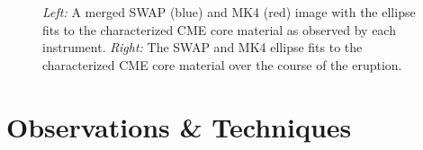 \documentclass[preprint2]{aastex}
\begin{document}
\begin{figure}
\centering
{}
\label{front_mults}
\label{ell_front}
\caption{\emph{Left:} A merged SWAP (blue) and MK4 (red) image with the ellipse fits to the characterized CME core material as observed by each instrument. \emph{Right:} The SWAP and MK4 ellipse fits to the characterized CME core material over the course of the eruption.}
\label{mk4_figs}
\end{figure}

\section{Observations \& Techniques}

\end{document}
